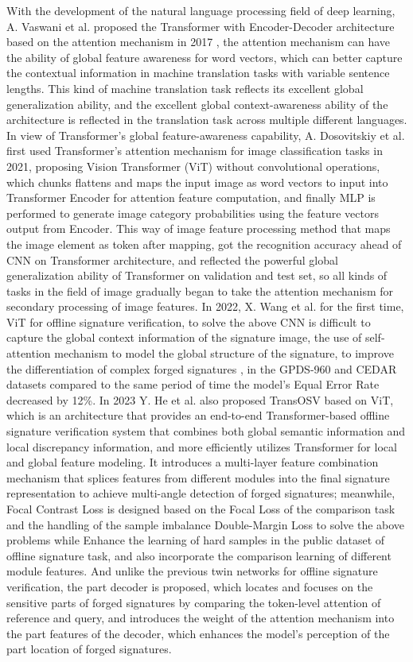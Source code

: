 With the development of the natural language processing field of deep learning, A. Vaswani et al. proposed the Transformer with Encoder-Decoder architecture based on the attention mechanism in 2017 \cite{36}, the attention mechanism can have the ability of global feature awareness for word vectors, which can better capture the contextual information in machine translation tasks with variable sentence lengths. This kind of machine translation task reflects its excellent global generalization ability, and the excellent global context-awareness ability of the architecture is reflected in the translation task across multiple different languages. In view of Transformer's global feature-awareness capability, A. Dosovitskiy et al. first used Transformer's attention mechanism for image classification tasks in 2021, proposing Vision Transformer (ViT) \cite{4} without convolutional operations, which chunks flattens and maps the input image as word vectors to input into Transformer Encoder for attention feature computation, and finally MLP is performed to generate image category probabilities using the feature vectors output from Encoder. This way of image feature processing method that maps the image element as token after mapping, got the recognition accuracy ahead of CNN on Transformer architecture, and reflected the powerful global generalization ability of Transformer on validation and test set, so all kinds of tasks in the field of image gradually began to take the attention mechanism for secondary processing of image features. In 2022, X. Wang et al. for the first time, ViT for offline signature verification, to solve the above CNN is difficult to capture the global context information of the signature image, the use of self-attention mechanism to model the global structure of the signature, to improve the differentiation of complex forged signatures \cite{39}, in the GPDS-960 and CEDAR \cite{30} datasets compared to the same period of time the model's Equal Error Rate decreased by 12\%. In 2023 Y. He et al. also proposed TransOSV \cite{41} based on ViT, which is an architecture that provides an end-to-end Transformer-based offline signature verification system that combines both global semantic information and local discrepancy information, and more efficiently utilizes Transformer for local and global feature modeling. It introduces a multi-layer feature combination mechanism that splices features from different modules into the final signature representation to achieve multi-angle detection of forged signatures; meanwhile, Focal Contrast Loss is designed based on the Focal Loss \cite{10} of the comparison task and the handling of the sample imbalance Double-Margin Loss \cite{25} to solve the above problems while Enhance the learning of hard samples in the public dataset of offline signature task, and also incorporate the comparison learning of different module features. And unlike the previous twin networks for offline signature verification, the part decoder is proposed, which locates and focuses on the sensitive parts of forged signatures by comparing the token-level attention of reference and query, and introduces the weight of the attention mechanism into the part features of the decoder, which enhances the model's perception of the part location of forged signatures. 